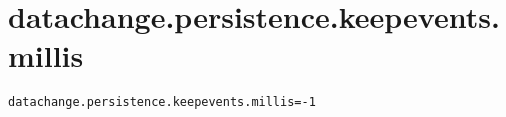 \section{datachange.persistence.keepevents.millis}
\label{configuration:DatachangePersistenceKeepeventsMillis}
\ClearAPI
\TODO
{}
\begin{lstlisting}[style=Props,caption={Usage example for \textit{datachange.persistence.keepevents.millis}}]
datachange.persistence.keepevents.millis=-1
\end{lstlisting}